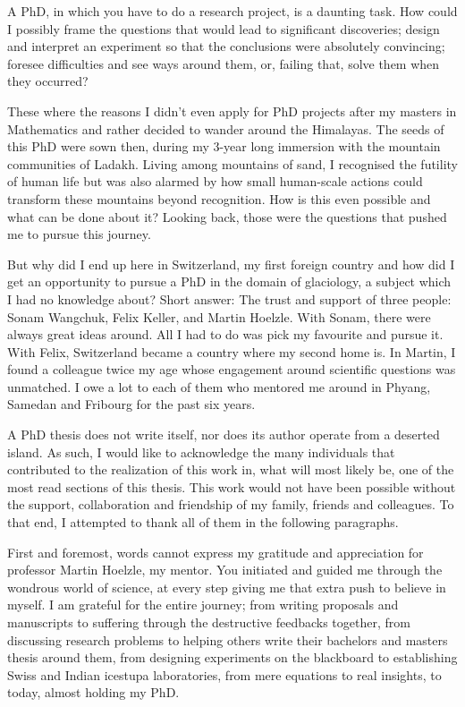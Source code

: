 %
\label{sec:acknowledgement}

A PhD, in which you have to do a research project, is a daunting task. How could I possibly frame the questions
that would lead to significant discoveries; design and interpret an experiment so that the conclusions were
absolutely convincing; foresee difficulties and see ways around them, or, failing that, solve them when they
occurred?

These where the reasons I didn't even apply for PhD projects after my masters in Mathematics and rather decided
to wander around the Himalayas. The seeds of this PhD were sown then, during my 3-year long immersion with the
mountain communities of Ladakh. Living among mountains of sand, I recognised the futility of human life but was
also alarmed by how small human-scale actions could transform these mountains beyond recognition. How is this
even possible and what can be done about it? Looking back, those were the questions that pushed me to pursue
this journey. 

But why did I end up here in Switzerland, my first foreign country and how did I get an opportunity to pursue a
PhD in the domain of glaciology, a subject which I had no knowledge about? Short answer: The trust and support
of three people: Sonam Wangchuk, Felix Keller, and Martin Hoelzle. With Sonam, there were always great ideas
around. All I had to do was pick my favourite and pursue it. With Felix, Switzerland became a country where my
second home is. In Martin, I found a colleague twice my age whose engagement around scientific questions was
unmatched. I owe a lot to each of them who mentored me around in Phyang, Samedan and Fribourg for the past six
years.

A PhD thesis does not write itself, nor does its author operate from a deserted island. As such, I would like to
acknowledge the many individuals that contributed to the realization of this work in, what will most likely be,
one of the most read sections of this thesis. This work would not have been possible without the support,
collaboration and friendship of my family, friends and colleagues. To that end, I attempted to thank all of them
in the following paragraphs.

First and foremost, words cannot express my gratitude and appreciation for professor Martin Hoelzle, my mentor.
You initiated and guided me through the wondrous world of science, at every step giving me that extra push to
believe in myself. I am grateful for the entire journey; from writing proposals and manuscripts to suffering
through the destructive feedbacks together, from discussing research problems to helping others write their
bachelors and masters thesis around them, from designing experiments on the blackboard to establishing Swiss and
Indian icestupa laboratories, from mere equations to real insights, to today, almost holding my PhD.

